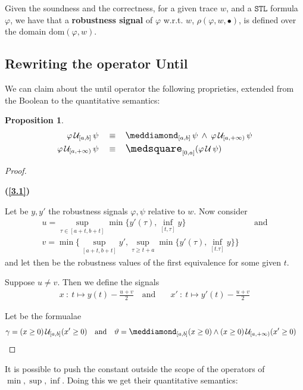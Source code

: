 \documentclass{suftesi}
\newtheorem*{proposition}{Proposition}
\renewcommand{\b}{\textbf}
\newcommand{\STL}{$\mathtt{STL}$ }
\newcommand{\dom}[1]{\mathrm{dom}(#1 ,w)}
\begin{document}
Given the soundness and the correctness, for a given trace $w$, and a \STL formula $\varphi$, we have that a \b{robustness signal} of $\varphi$ w.r.t. $w$, $\rho(\varphi,w,\bullet)$, is defined over the domain $\dom{\varphi}$.

\subsection{Rewriting the operator Until}
We can claim about the until operator the following proprieties, extended from the Boolean to the quantitative semantics:
\begin{proposition}\label{quantitative until}
    \begin{align}
        \varphi \,\mathcal{U}_{[a,b]}\,\psi\quad    \equiv  &\quad\pos_{[a,b]}\psi\:\land\:\varphi\,\mathcal{U}_{[a,+\infty)}\,\psi \label{3.1}\\
        \varphi\,\mathcal{U}_{[a,+\infty)}\,\psi\quad   \equiv  &\quad\nec_{[0,a]}(\varphi\,\mathcal{U}\,\psi) \label{3.2}
    \end{align}
\end{proposition}


\begin{proof} \textcolor{white}{---}

    \b{(\ref{3.1})}

    Let be $y,y'$ the robustness signals $\varphi, \psi$ relative to $w$. Now consider 
        \begin{align*}
            u=\sup_{\tau\in[a+t,b+t]}\min\biggl\{y'(\tau), \inf_{[t,\tau]}y\biggr\} &\quad \text{and}\\ v=\min\biggl\{\sup_{[a+t,b+t]}y',\sup_{\tau\geq t+a}\min\biggl\{y'(\tau),\inf_{[t.\tau]}y\biggr\}\biggr\}
        \end{align*}
    and let then be the robustness values of the first equivalence for some given $t$.

    Suppose $u\neq v$. Then we define the signals 
    \begin{align*}
        x\::\:t\mapsto y(t)-\frac{u+v}{2} \quad \text{and}  &\quad x'\::\:t\mapsto y'(t)-\frac{u+v}{2}
    \end{align*}

    Let be the formualae
    \begin{align*}
        \gamma=(x\geq0)\,\mathcal{U}_{[a,b]}(x'\geq 0) \quad \text{and}  &\quad \vartheta = \pos_{[a,b]} (x\geq0)\land(x\geq0)\,\mathcal{U}_{[a,+\infty)}(x'\geq 0)
    \end{align*}
\end{proof}
It is possible to push the constant outside the scope of the operators of $\min, \sup,\inf$. Doing this we get their quantitative semantics:
\end{document}
